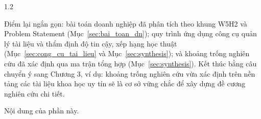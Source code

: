 \begin{spacing}{1.2}
\begin{huongdan}
Điểm lại ngắn gọn: bài toán doanh nghiệp đã phân tích theo khung W5H2 và Problem Statement (Mục~\ref{sec:bai_toan_dn}); quy trình ứng dụng công cụ quản lý tài liệu và thẩm định độ tin cậy, xếp hạng học thuật (Mục~\ref{sec:cong_cu_tai_lieu} và Mục~\ref{sec:synthesis}); và khoảng trống nghiên cứu đã xác định qua ma trận tổng hợp (Mục~\ref{sec:synthesis}). Kết thúc bằng câu chuyển ý sang Chương 3, ví dụ: khoảng trống nghiên cứu vừa xác định trên nền tảng các tài liệu khoa học uy tín sẽ là cơ sở vững chắc để xây dựng đề cương nghiên cứu chi tiết.
\end{huongdan}

Nội dung của phần này.

\end{spacing}
